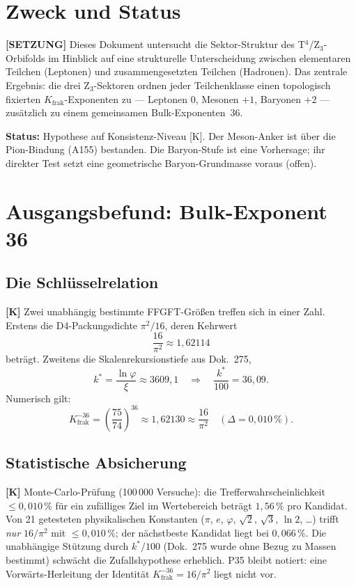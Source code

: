
\section{Zweck und Status}

\textbf{[SETZUNG]} Dieses Dokument untersucht die Sektor-Struktur des
T$^4$/Z$_3$-Orbifolds im Hinblick auf eine strukturelle Unterscheidung
zwischen elementaren Teilchen (Leptonen) und zusammengesetzten Teilchen
(Hadronen). Das zentrale Ergebnis: die drei Z$_3$-Sektoren ordnen jeder
Teilchenklasse einen topologisch fixierten $K_\text{frak}$-Exponenten zu
--- Leptonen $0$, Mesonen $+1$, Baryonen $+2$ --- zusätzlich zu einem
gemeinsamen Bulk-Exponenten~$36$.

\textbf{Status:} Hypothese auf Konsistenz-Niveau [K].
Der Meson-Anker ist über die Pion-Bindung (A155) bestanden.
Die Baryon-Stufe ist eine Vorhersage; ihr direkter Test setzt eine
geometrische Baryon-Grundmasse voraus (offen).

\section{Ausgangsbefund: Bulk-Exponent 36}

\subsection{Die Schlüsselrelation}

\textbf{[K]} Zwei unabhängig bestimmte FFGFT-Größen treffen sich in
einer Zahl. Erstens die D4-Packungsdichte $\pi^2/16$, deren Kehrwert
\[
  \frac{16}{\pi^2} \approx 1{,}62114
\]
beträgt. Zweitens die Skalenrekursionstiefe aus Dok.~275,
\[
  k^* = \frac{\ln\varphi}{\xi} \approx 3609{,}1
  \quad\Rightarrow\quad \frac{k^*}{100} = 36{,}09.
\]
Numerisch gilt:
\[
  K_\text{frak}^{-36} = \left(\frac{75}{74}\right)^{36} \approx 1{,}62130
  \approx \frac{16}{\pi^2} \quad (\Delta = 0{,}010\,\%).
\]

\subsection{Statistische Absicherung}

\textbf{[K]} Monte-Carlo-Prüfung (100\,000 Versuche): die
Trefferwahrscheinlichkeit $\leq 0{,}010\,\%$ für ein zufälliges Ziel im
Wertebereich beträgt $1{,}56\,\%$ pro Kandidat. Von 21 getesteten
physikalischen Konstanten ($\pi$, $e$, $\varphi$, $\sqrt2$, $\sqrt3$,
$\ln 2$, \ldots) trifft \emph{nur} $16/\pi^2$ mit $\leq 0{,}010\,\%$;
der nächstbeste Kandidat liegt bei $0{,}066\,\%$. Die unabhängige
Stützung durch $k^*/100$ (Dok.~275 wurde ohne Bezug zu Massen bestimmt)
schwächt die Zufallshypothese erheblich. P35 bleibt notiert: eine
Vorwärts-Herleitung der Identität $K_\text{frak}^{-36} = 16/\pi^2$
liegt nicht vor.

